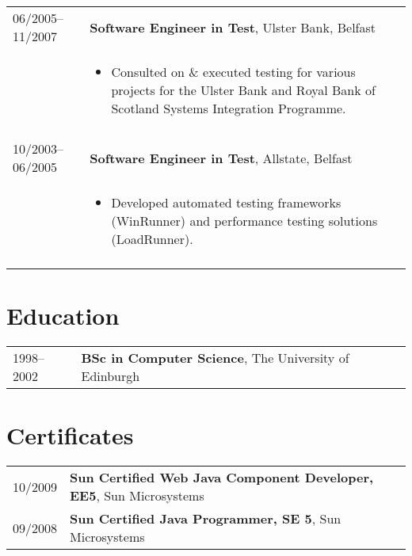 \documentclass[2pt,a4paper]{article}
\newlength{\datecolumn}
\newlength{\textcolumn}
\begin{document}
\begin{longtable}{p{\datecolumn} p{\textcolumn}}
06/2005--11/2007 & \textbf{Software Engineer in Test}, Ulster Bank, Belfast \\
                 & \begin{itemize}
                         \item Consulted on \& executed testing for various projects for the Ulster Bank and Royal Bank of Scotland Systems Integration Programme.
                   \end{itemize} \\ \\
10/2003--06/2005 & \textbf{Software Engineer in Test}, Allstate, Belfast \\
                 & \begin{itemize}
                         \item Developed automated testing frameworks (WinRunner) and performance testing solutions (LoadRunner).
                   \end{itemize} \\ \\
\end{longtable}

\section*{Education}
\begin{tabular}{p{\datecolumn} p{\textcolumn}}
1998--2002 & \textbf{BSc in Computer Science}, The University of Edinburgh \\
\end{tabular}

\section*{Certificates}
\begin{tabular}{p{\datecolumn} p{\textcolumn}}
10/2009 & \textbf{Sun Certified Web Java Component Developer, EE5}, Sun Microsystems \\
09/2008 & \textbf{Sun Certified Java Programmer, SE 5}, Sun Microsystems \\
\end{tabular}

\end{document}
